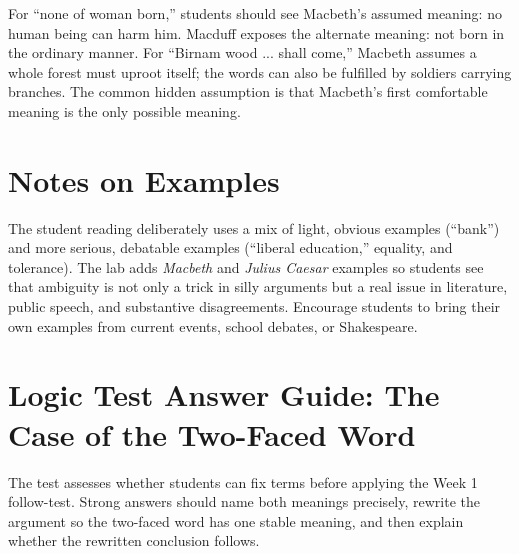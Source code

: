 \documentclass[12pt]{article}
\begin{document}
For ``none of woman born,'' students should see Macbeth's assumed meaning: no human being can harm him. Macduff exposes the alternate meaning: not born in the ordinary manner. For ``Birnam wood ... shall come,'' Macbeth assumes a whole forest must uproot itself; the words can also be fulfilled by soldiers carrying branches. The common hidden assumption is that Macbeth's first comfortable meaning is the only possible meaning.

\section*{Notes on Examples}
The student reading deliberately uses a mix of light, obvious examples (“bank”) and more serious, debatable examples (“liberal education,” equality, and tolerance). The lab adds \textit{Macbeth} and \textit{Julius Caesar} examples so students see that ambiguity is not only a trick in silly arguments but a real issue in literature, public speech, and substantive disagreements. Encourage students to bring their own examples from current events, school debates, or Shakespeare.

\section*{Logic Test Answer Guide: The Case of the Two-Faced Word}
The test assesses whether students can fix terms before applying the Week 1 follow-test. Strong answers should name both meanings precisely, rewrite the argument so the two-faced word has one stable meaning, and then explain whether the rewritten conclusion follows.
\end{document}
